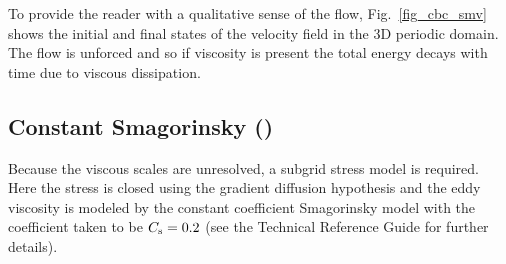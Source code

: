 \documentclass[11pt]{book}
\begin{document}
To provide the reader with a qualitative sense of the flow, Fig.~\ref{fig_cbc_smv} shows the initial and final states of the velocity field in the 3D periodic domain.  The flow is unforced and so if viscosity is present the total energy decays with time due to viscous dissipation.

\subsection{Constant Smagorinsky (\texorpdfstring{}{csmag})}

Because the viscous scales are unresolved, a subgrid stress model is required. Here the stress is closed using the gradient diffusion hypothesis and the eddy viscosity is modeled by the constant coefficient Smagorinsky model with the coefficient taken to be $C_{\rm s} = 0.2$ (see the Technical Reference Guide for further details).
\end{document}
